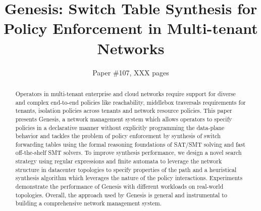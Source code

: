 \documentclass[letterpaper,twocolumn,10pt]{sig-alternate-10pt}
\title{Genesis: Switch Table Synthesis for Policy Enforcement in Multi-tenant Networks}
\author{Paper \#107, XXX pages}
\begin{document}
\maketitle

\begin{abstract}
Operators in multi-tenant enterprise and cloud networks require support for diverse and complex end-to-end policies like reachability, middlebox traversals requirements for tenants, isolation policies across tenants and network resource policies. This paper presents Genesis, a network management system which allows operators to specify policies in a declarative manner without explicitly programming the data-plane behavior and tackles the problem of policy enforcement by synthesis of switch forwarding tables using the formal reasoning foundations of SAT/SMT solving and fast off-the-shelf SMT solvers. To improve synthesis performance, we design a novel search strategy using regular expressions and finite automata to leverage the network structure in datacenter topologies to specify properties of the path and a heuristical synthesis algorithm which leverages the nature of the policy interactions. Experiments demonstrate the performance of Genesis with different workloads on real-world topologies. Overall, the approach used by Genesis is general and instrumental to building a comprehensive network management system.

\end{abstract}












%



\begin{small}
	
\end{small}
\end{document}
